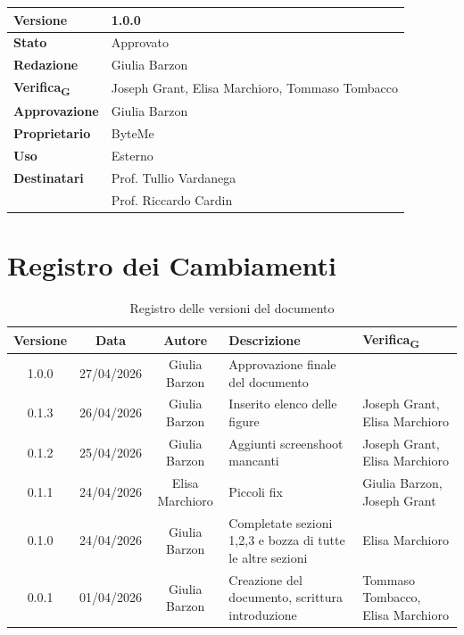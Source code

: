 \documentclass[11pt,a4paper]{article}
\newcommand{\gls}[1]{#1\textsubscript{G}}
\begin{document}
\begin{titlepage}
    \begin{table}[H]
        \centering
        \begin{tabular}{|l|p{5cm}|}
            \hline
            \textbf{Versione} & 1.0.0 \\
            \hline
            \textbf{Stato} & Approvato\\
            \hline
            \textbf{Redazione} & Giulia Barzon\\
            \hline
            \textbf{\gls{Verifica}} & Joseph Grant, Elisa Marchioro, Tommaso Tombacco \\
            \hline
            \textbf{Approvazione} & Giulia Barzon\\
            \hline
            \textbf{Proprietario} & ByteMe \\
            \hline
            \textbf{Uso} & Esterno \\
            \hline
            \textbf{Destinatari} & Prof. Tullio Vardanega \\ & Prof. Riccardo Cardin \\
            \hline
        \end{tabular}
    \end{table}
    
    \vfill
\end{titlepage}

\thispagestyle{empty}
\section*{Registro dei Cambiamenti}

\begin{table}[H]
    \centering
    \begin{tabular}{|c|c|c|>{\raggedright\arraybackslash}p{}|p{}|}
        \hline
        \textbf{Versione} & \textbf{Data} & \textbf{Autore} & \textbf{Descrizione} & \textbf{\gls{Verifica}} \\
        \hline
        1.0.0 & 27/04/2026 & Giulia Barzon & Approvazione finale del documento & \\
        \hline
        0.1.3 & 26/04/2026 & Giulia Barzon & Inserito elenco delle figure & Joseph Grant, Elisa Marchioro\\
        \hline
        0.1.2 & 25/04/2026 & Giulia Barzon & Aggiunti screenshoot mancanti & Joseph Grant, Elisa Marchioro\\
        \hline
        0.1.1 & 24/04/2026 & Elisa Marchioro & Piccoli fix & Giulia Barzon, Joseph Grant\\
        \hline
        0.1.0 & 24/04/2026 & Giulia Barzon & Completate sezioni 1,2,3 e bozza di tutte le altre sezioni & Elisa Marchioro\\
        \hline
        0.0.1 & 01/04/2026 & Giulia Barzon & Creazione del documento, scrittura introduzione & Tommaso Tombacco, Elisa Marchioro \\
        \hline
    \end{tabular}
    \caption{Registro delle versioni del documento}
    \label{tab:versionamento}
\end{table}
\end{document}
